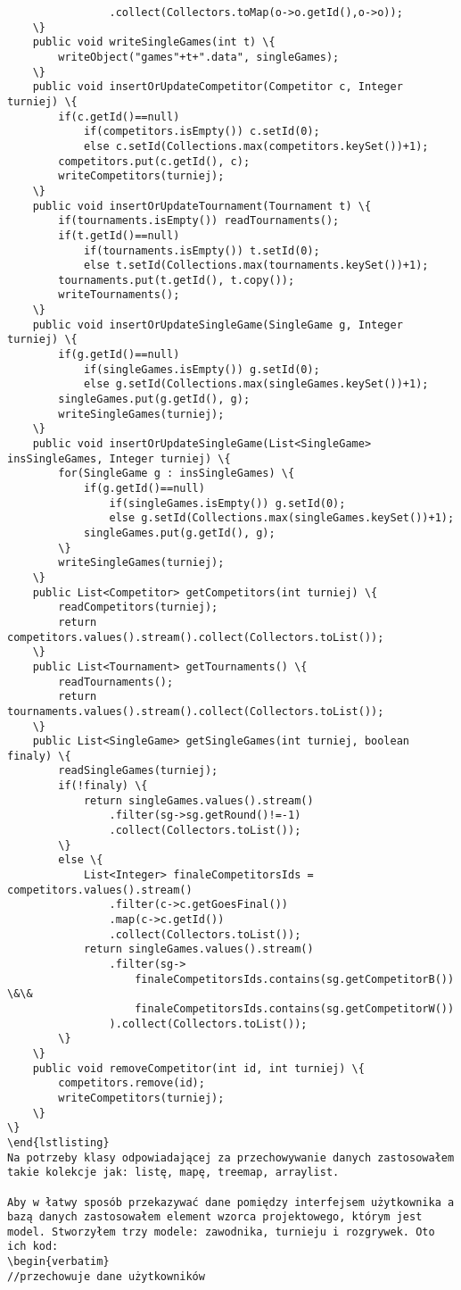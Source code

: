 \begin{verbatim}
				.collect(Collectors.toMap(o->o.getId(),o->o));
	\}
	public void writeSingleGames(int t) \{
		writeObject("games"+t+".data", singleGames);
	\}
	public void insertOrUpdateCompetitor(Competitor c, Integer turniej) \{
		if(c.getId()==null) 
			if(competitors.isEmpty()) c.setId(0);
			else c.setId(Collections.max(competitors.keySet())+1);
		competitors.put(c.getId(), c);
		writeCompetitors(turniej);
	\}
	public void insertOrUpdateTournament(Tournament t) \{
		if(tournaments.isEmpty()) readTournaments();
		if(t.getId()==null)
			if(tournaments.isEmpty()) t.setId(0);
			else t.setId(Collections.max(tournaments.keySet())+1);
		tournaments.put(t.getId(), t.copy());
		writeTournaments();
	\}
	public void insertOrUpdateSingleGame(SingleGame g, Integer turniej) \{
		if(g.getId()==null) 
			if(singleGames.isEmpty()) g.setId(0);
			else g.setId(Collections.max(singleGames.keySet())+1);
		singleGames.put(g.getId(), g);
		writeSingleGames(turniej);
	\}
	public void insertOrUpdateSingleGame(List<SingleGame> insSingleGames, Integer turniej) \{
		for(SingleGame g : insSingleGames) \{
			if(g.getId()==null) 
				if(singleGames.isEmpty()) g.setId(0);
				else g.setId(Collections.max(singleGames.keySet())+1);
			singleGames.put(g.getId(), g);
		\}
		writeSingleGames(turniej);
	\}
	public List<Competitor> getCompetitors(int turniej) \{
		readCompetitors(turniej);
		return competitors.values().stream().collect(Collectors.toList());
	\}
	public List<Tournament> getTournaments() \{
		readTournaments();
		return tournaments.values().stream().collect(Collectors.toList());
	\}
	public List<SingleGame> getSingleGames(int turniej, boolean finaly) \{
		readSingleGames(turniej);
		if(!finaly) \{
			return singleGames.values().stream()
				.filter(sg->sg.getRound()!=-1)
				.collect(Collectors.toList());
		\}
		else \{
			List<Integer> finaleCompetitorsIds = competitors.values().stream()
				.filter(c->c.getGoesFinal())
				.map(c->c.getId())
				.collect(Collectors.toList());
			return singleGames.values().stream()
				.filter(sg->
					finaleCompetitorsIds.contains(sg.getCompetitorB()) \&\& 
					finaleCompetitorsIds.contains(sg.getCompetitorW())
				).collect(Collectors.toList());
		\}
	\}
	public void removeCompetitor(int id, int turniej) \{
		competitors.remove(id);
		writeCompetitors(turniej);
	\}
\}
\end{lstlisting}
Na potrzeby klasy odpowiadającej za przechowywanie danych zastosowałem takie kolekcje jak: listę, mapę, treemap, arraylist.

Aby w łatwy sposób przekazywać dane pomiędzy interfejsem użytkownika a bazą danych zastosowałem element wzorca projektowego, którym jest model. Stworzyłem trzy modele: zawodnika, turnieju i rozgrywek. Oto ich kod:
\begin{verbatim}
//przechowuje dane użytkowników


\end{verbatim}
